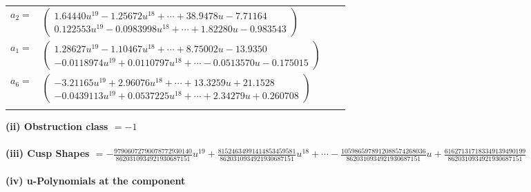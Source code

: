 \documentclass[1p]{elsarticle_modified}
\theoremstyle{definition}
\begin{document}
\begin{tabular}{m{7pt} m{180pt} m{7pt} m{180pt} }
\flushright $a_{2}=$&$\begin{pmatrix}1.64440 u^{19}-1.25672 u^{18}+\cdots+38.9478 u-7.71164\\0.122553 u^{19}-0.0983998 u^{18}+\cdots+1.82280 u-0.983543\end{pmatrix}$ \\
\flushright $a_{1}=$&$\begin{pmatrix}1.28627 u^{19}-1.10467 u^{18}+\cdots+8.75002 u-13.9350\\-0.0118974 u^{19}+0.0110797 u^{18}+\cdots-0.0513570 u-0.175015\end{pmatrix}$ \\
\flushright $a_{6}=$&$\begin{pmatrix}-3.21165 u^{19}+2.96076 u^{18}+\cdots+13.3259 u+21.1528\\-0.0439113 u^{19}+0.0537225 u^{18}+\cdots+2.34279 u+0.260708\end{pmatrix}$\\&\end{tabular}
\flushleft \textbf{(ii) Obstruction class $= -1$}\\~\\
\flushleft \textbf{(iii) Cusp Shapes $= -\frac{97906072790078772930140}{8620310934921930687151} u^{19}+\frac{81524634991414853459581}{8620310934921930687151} u^{18}+\cdots-\frac{1059865978912088574268036}{8620310934921930687151} u+\frac{616271317183349139490199}{8620310934921930687151}$}\\~\\
\newpage\renewcommand{\arraystretch}{1}
\flushleft \textbf{(iv) u-Polynomials at the component}\newline \\
\end{document}
